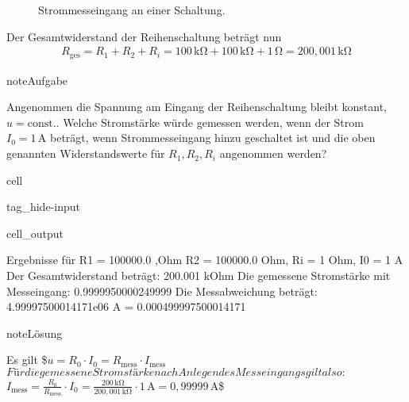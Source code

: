 \documentclass[letterpaper,10pt,english]{jupyterBook}
\let\sphinxpxdimen\pdfpxdimen\else\newdimen\sphinxpxdimen
\begin{document}
\begin{figure}[htbp]
\centering
\capstart

\noindent\sphinxincludegraphics[width=400\sphinxpxdimen]{{strommesseingang_R1R2}.jpg}
\caption{Strommesseingang an einer Schaltung.}\label{\detokenize{content/4_I-Messeingang:strommesseingang-r1r2}}\end{figure}

\sphinxAtStartPar
Der Gesamtwiderstand der Reihenschaltung beträgt nun
\begin{equation*}
\begin{split}R_\mathrm{ges} = R_1 + R_2 + R_i = 100\,\mathrm{k\Omega} + 100\,\mathrm{k\Omega} + 1\,\mathrm{\Omega} = 200,001\,\mathrm{k\Omega}\end{split}
\end{equation*}
\begin{sphinxadmonition}{note}{Aufgabe}

\sphinxAtStartPar
Angenommen die Spannung am Eingang der Reihenschaltung bleibt konstant, \(u = \mathrm{const.}\). Welche Stromstärke würde gemessen werden, wenn der Strom \(I_0 = 1\,\mathrm A\) beträgt, wenn  Strommesseingang hinzu geschaltet ist und die oben genannten Widerstandswerte für \(R_1, R_2, R_i\) angenommen werden?
\end{sphinxadmonition}

\begin{sphinxuseclass}{cell}
\begin{sphinxuseclass}{tag_hide-input}\begin{sphinxVerbatimOutput}

\begin{sphinxuseclass}{cell_output}
\begin{sphinxVerbatim}[commandchars=\\\{\}]
Ergebnisse für R\PYGZus{}1 = 100000.0 ,Ohm R\PYGZus{}2 = 100000.0 Ohm, R\PYGZus{}i = 1 Ohm, I\PYGZus{}0 = 1 A
Der Gesamtwiderstand beträgt: 200.001 kOhm
Die gemessene Stromstärke mit Messeingang:  0.9999950000249999
Die Messabweichung beträgt:  \PYGZhy{}4.99997500014171e\PYGZhy{}06 A =  0.000499997500014171 \PYGZpc{}
\end{sphinxVerbatim}

\end{sphinxuseclass}\end{sphinxVerbatimOutput}

\end{sphinxuseclass}
\end{sphinxuseclass}
\begin{sphinxadmonition}{note}{Lösung}

\sphinxAtStartPar
Es gilt
\$\(u = R_0 \cdot I_0 = R_\mathrm{mess} \cdot I_\mathrm{mess}\)\(
Für die gemessene Stromstärke nach Anlegen des Messeingangs gilt also:
\)\(I_\mathrm{mess} = \frac{R_0}{R_\mathrm{mess}} \cdot I_0 = \frac{200\,\mathrm{k\Omega}}{200,001\,\mathrm{k\Omega}} \cdot 1\,\mathrm A = 0,99999\,\mathrm A\)\$
\end{sphinxadmonition}
\end{document}
